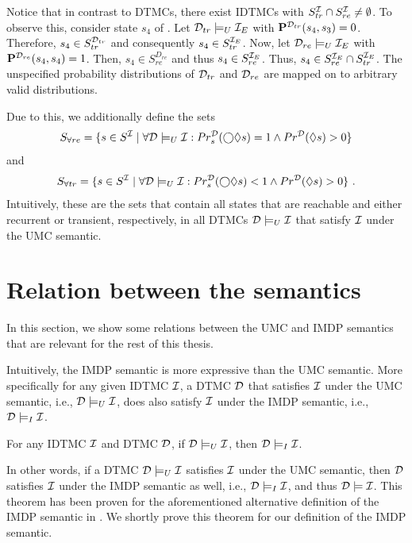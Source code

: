 Notice that in contrast to DTMCs, there exist IDTMCs with $S_{tr}^{\mathcal{I}} \cap S_{re}^{\mathcal{I}} \neq \emptyset$. To observe this, consider state $s_4$ of . Let $\mathcal{D}_{tr} \models_U \mathcal{I}_E$ with $\mathbf{P}^{\mathcal{D}_{tr}}(s_4,s_3) = 0$. Therefore, $s_4\in S_{tr}^{\mathcal{D}_{tr}}$ and consequently $s_4 \in S_{tr}^{\mathcal{I}_E}$. Now, let $\mathcal{D}_{re} \models_U \mathcal{I}_E$ with $\mathbf{P}^{\mathcal{D}_{re}}(s_4,s_4) = 1$. Then, $s_4\in S^{D_{re}}_{re}$ and thus $s_4 \in S^{\mathcal{I}_E}_{re}$. Thus, $s_4 \in S^{\mathcal{I}_E}_{re} \cap S^{\mathcal{I}_E}_{tr}$. The unspecified probability distributions of $\mathcal{D}_{tr}$ and $\mathcal{D}_{re}$ are mapped on to arbitrary valid distributions.

Due to this, we additionally define the sets 
\[S_{\forall re} = \{s \in S^{\mathcal{I}} \mid \forall \mathcal{D} \models_U \mathcal{I}: Pr^{\mathcal{D}}_s(\bigcirc\lozenge s) = 1 \land Pr^{\mathcal{D}}(\lozenge s) > 0\}\]
and 
\[S_{\forall tr} = \{s \in S^{\mathcal{I}} \mid \forall \mathcal{D} \models_U \mathcal{I}: Pr^{\mathcal{D}}_s(\bigcirc\lozenge s) < 1 \land Pr^{\mathcal{D}}(\lozenge s) > 0\}\ .\] 
Intuitively, these are the sets that contain all states that are reachable and either recurrent or transient, respectively, in all DTMCs $\mathcal{D} \models_U \mathcal{I}$ that satisfy $\mathcal{I}$ under the UMC semantic.

\section{Relation between the semantics}\label{sec:relation_between_the_semantics}
In this section, we show some relations between the UMC and IMDP semantics that are relevant for the rest of this thesis.

Intuitively, the IMDP semantic is more expressive than the UMC semantic. More specifically for any given IDTMC $\mathcal{I}$, a DTMC $\mathcal{D}$ that satisfies $\mathcal{I}$ under the UMC semantic, i.e., $\mathcal{D} \models_U \mathcal{I}$, does also satisfy $\mathcal{I}$ under the IMDP semantic, i.e., $\mathcal{D} \models_I \mathcal{I}$.
\begin{theorem}\label{th:relation_of_semantics}
    For any IDTMC $\mathcal{I}$ and DTMC $\mathcal{D}$, if $\mathcal{D} \models_U \mathcal{I}$, then $\mathcal{D} \models_I \mathcal{I}$.
\end{theorem}

In other words, if a DTMC $\mathcal{D}\models_U\mathcal{I}$ satisfies $\mathcal{I}$ under the UMC semantic, then $\mathcal{D}$ satisfies $\mathcal{I}$ under the IMDP semantic as well, i.e., $\mathcal{D} \models_I \mathcal{I}$, and thus $\mathcal{D} \models \mathcal{I}$. This theorem has been proven for the aforementioned alternative definition of the IMDP semantic in \cite{Semantics_Quant-Analysis}.
We shortly prove this theorem for our definition of the IMDP semantic.

